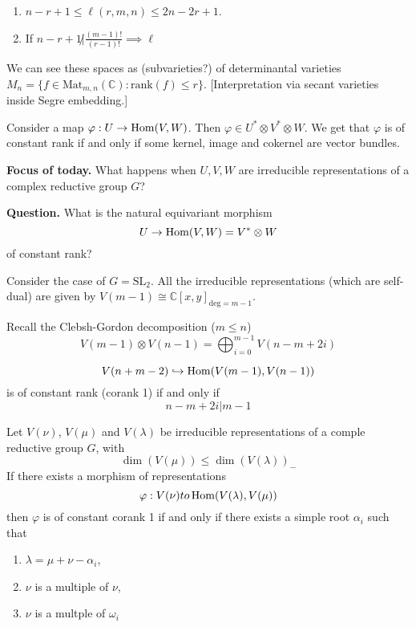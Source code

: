 \begin{theorem}[Westwick '86]
\label{theorem-Westwick}
\begin{enumerate}
\item $n-r+1 \leq \ell(r,m,n) \leq 2n-2r+1$.
\item If $n-r+1 \not| \frac{(m-1)!}{(r-1)!}\implies \ell$
\end{enumerate}
\end{theorem}

We can see these spaces as (subvarieties?) of determinantal varieties
$M_n=\{f \in \text{Mat}_{m,n}(\mathbb{C}):\text{rank}(f) \leq  r\}$. 
[Interpretation via secant varieties inside Segre embedding.]

\medskip\noindent
Consider a map $\varphi: U \to \mathop{\mathrm{Hom}}\nolimits(V,W)$.
Then $\varphi \in U^* \otimes  V^* \otimes  W$.
We get that
$\varphi$ is of constant rank if and only if
some kernel, image and cokernel are vector bundles.

\medskip\noindent
{\bf Focus of today.} What happens when $U,V,W$ are irreducible
representations of a complex reductive group  $G$?

\medskip\noindent
{\bf Question.} What is the natural equivariant morphism
$$
U \to \mathop{\mathrm{Hom}}\nolimits(V,W)=V^* \otimes  W
$$
of constant rank?

\medskip\noindent
Consider the case of $G=\text{SL}_2$. All the 
irreducible representations (which are self-dual) are given by
$V(m-1)\cong \mathbb{C}[x,y]_{\text{deg}=m-1}$.

Recall the Clebsh-Gordon decomposition ($m \leq  n$)
$$
V(m-1)\otimes  V(n-1)=\bigoplus_{i=0}^{m-1}V(n-m+2i)
$$

\begin{theorem}
\label{theorem-BFL22}
$$
V(n+m-2)\hookrightarrow \mathop{\mathrm{Hom}}\nolimits(V(m-1),V(n-1))
$$
is of constant rank (corank 1) if and only if
$$
n-m+2i|m-1
$$
\end{theorem}

\begin{theorem}
\label{theorem-BFF25}
Let $V(\nu)$, $V(\mu)$ and $V(\lambda)$ be irreducible representations
of a comple reductive group $G$, with 
$$
\dim(V(\mu)) \leq \dim(V(\lambda))_-
$$
If there exists a morphism of representations
$$
\varphi: V (\nu) to \mathop{\mathrm{Hom}}\nolimits (V (\lambda),V(\mu))
$$
then $\varphi$ is of constant corank 1 if and only if 
there exists a simple root $\alpha_i$ such that
\begin{enumerate}
\item $\lambda=\mu+\nu-\alpha_i$,
\item $\nu$ is a multiple of $\nu$,
\item  $\nu$ is a multple of $\omega_i$
\end{enumerate}
\end{theorem} 

